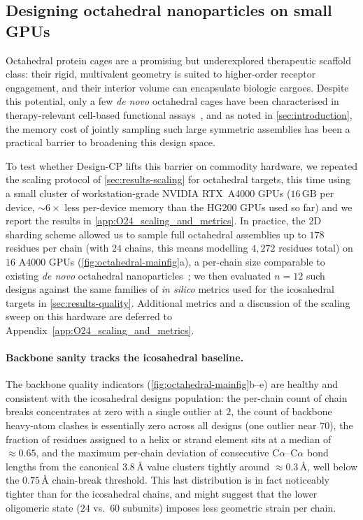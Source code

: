 \documentclass{article}
\theoremstyle{plain}
\theoremstyle{definition}
\theoremstyle{remark}
\begin{document}


\subsection{Designing octahedral nanoparticles on small GPUs}
\label{sec:results-democratization}

Octahedral protein cages are a promising but underexplored therapeutic scaffold class: their rigid, multivalent geometry is suited to higher-order receptor engagement, and their interior volume can encapsulate biologic cargoes. Despite this potential, only a few \emph{de novo} octahedral cages have been characterised in therapy-relevant cell-based functional assays~\cite{divine_designed_2021, yang_computational_2024}, and as noted in \cref{sec:introduction}, the memory cost of jointly sampling such large symmetric assemblies has been a practical barrier to broadening this design space.

To test whether Design-CP lifts this barrier on commodity hardware, we repeated the scaling protocol of \cref{sec:results-scaling} for octahedral targets, this time using a small cluster of workstation-grade NVIDIA RTX~A4000 GPUs ($16$\,GB per device, ${\sim}6\times$ less per-device memory than the HG200 GPUs used so far) and we report the results in \cref{app:O24_scaling_and_metrics}. In practice, the 2D sharding scheme allowed us to sample full octahedral assemblies up to $178$ residues per chain (with $24$ chains, this means modelling $4{,}272$ residues total) on $16$ A4000 GPUs (\cref{fig:octahedral-mainfig}a), a per-chain size comparable to existing \emph{de novo} octahedral nanoparticles~\cite{king_computational_2012}; we then evaluated $n=12$ such designs against the same families of \emph{in silico} metrics used for the icosahedral targets in \cref{sec:results-quality}. Additional metrics and a discussion of the scaling sweep on this hardware are deferred to Appendix~\ref{app:O24_scaling_and_metrics}.

\paragraph{Backbone sanity tracks the icosahedral baseline.} The backbone quality indicators (\cref{fig:octahedral-mainfig}b--e) are healthy and consistent with the icosahedral designs population: the per-chain count of chain breaks concentrates at zero with a single outlier at $2$, the count of backbone heavy-atom clashes is essentially zero across all designs (one outlier near $70$), the fraction of residues assigned to a helix or strand element sits at a median of $\approx 0.65$, and the maximum per-chain deviation of consecutive C$\alpha$--C$\alpha$ bond lengths from the canonical $3.8$\,\AA{} value clusters tightly around $\approx 0.3$\,\AA{}, well below the $0.75$\,\AA{} chain-break threshold. This last distribution is in fact noticeably tighter than for the icosahedral chains, and might suggest that the lower oligomeric state ($24$ vs.\ $60$ subunits) imposes less geometric strain per chain.
\end{document}
